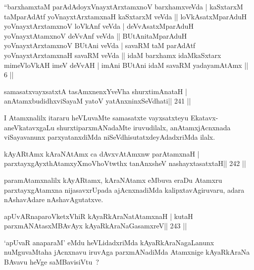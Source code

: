 
\begin{kandikeshl}
``barxhamxtaM parAdAdoyxVnayxtArxtamxnoV barxhamxveVda |
kaSxtarxM taMparAdAtf yoV\s nayxtArxtamxnaH kaSxtarxM veVda ||
loVkAsatxMparAduH yoV\s nayxtArxtamxnoV loVkAnf veVda |
deVvAsatxMparAduH yoV\s nayxtAtamxnoV deVvAnf veVda ||
BUtAnitaMparAduH yoV\s nayxtArxtamxnoV BUtAni veVda |
savaRM taM parAdAtf yoV\s nayxtArxtamxnaH savaRM veVda ||
idaM barxhamx idaMkaSxtarx mimeVloVkAH imeV deVvAH |
imAni BUtAni idaM savaRM yadayamAtAmx || 6 ||
\end{kandikeshl}


\begin{shl}
samasatxvayxsatxtA tasAmxnenxYveVha shurxtimAnataH |
anAtamxbudidhxviSayaM yatoV yatAnxninxSeVdhati\hfill || 241 ||
\end{shl}

\begin{artha}
I Atamxnalilx itararu heVLuvaMte samasatxte vayxsatxteyu Ekatavx-aneVkatavxgaLu shurxtiparxmANadaMte iruvudilalx, anAtamxjAcnxnada viSayavanunx parxyatanxdiMda niSeVdhisutatxdeyAdadxriMda ilalx.
\end{artha}

\begin{shl}
kAyARtAmx kAraNAtAmx ca dAvxvAtAmxnw parAtamxnaH |
parxtayxgAyxthAtamxyXmoVhoVtwthx tanAnxsheV nashayxtasatxtaH\hfill || 242 ||
\end{shl}

\begin{artha}
paramAtamxnalilx kAyARtamx, kAraNAtamx eMbuva eraDu Atamxru parxtayxgAtamxna nijasavxrUpada ajAcnxnadiMda kalipxtavAgiruvaru, adara nAshavAdare nAshavAgutatxve.
\end{artha}

\begin{shl}
apUvARnaparoVketxVhiR kAyaRkAraNatA\s\s tamxnaH |
kutaH parxmANAtasxMBAvAyx kAyaRkAraNaGasamxreV\hfill || 243 ||
\end{shl}

\begin{artha}
`apUvaR anaparaM' eMdu heVLidadxriMda kAyaRkAraNagaLanunx nuMguvaMtaha jAcnxnavu iruvAga parxmANadiMda Atamxnige kAyaRkAraNa BAvavu heVge saMBavisiVtu~?
\end{artha}

